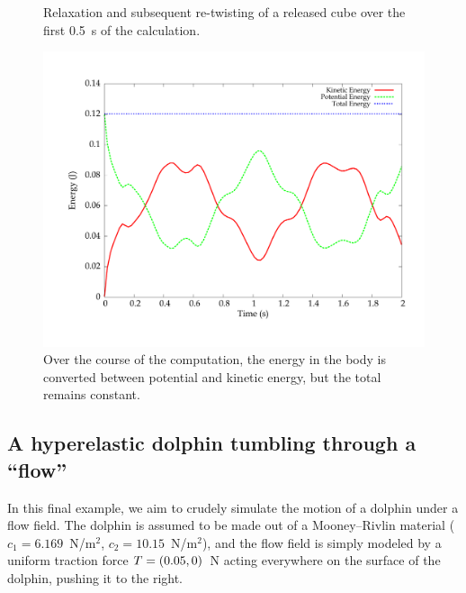 \begin{figure}[ht]
\begin{center}
{      }
    \caption{Relaxation and subsequent re-twisting of a released cube
      over the first 0.5~s of the calculation.}
  \end{center}
  \label{fig:narayanan:releasedcube}
\end{figure}

\begin{figure}[ht]
  \begin{center}
    \includegraphics[scale=10]{chapters/narayanan/images/pdf/energies.pdf}
  \end{center}
  \caption{Over the course of the computation, the energy in the body
    is converted between potential and kinetic energy, but the total
    remains constant.}
    \label{fig:narayanan:energies}
\end{figure}

\subsection{A hyperelastic dolphin tumbling through a ``flow''}

In this final example, we aim to crudely simulate the motion of a
dolphin under a flow field. The dolphin is assumed to be made out of a
Mooney--Rivlin material ($c_{1} = 6.169$~N/m$^2$, $c_{2} =
10.15$~N/m$^2$), and the flow field is simply modeled by a uniform
traction force $\mbox{$ T$} = (0.05, 0)$~N acting everywhere on the surface of
the dolphin, pushing it to the right.

